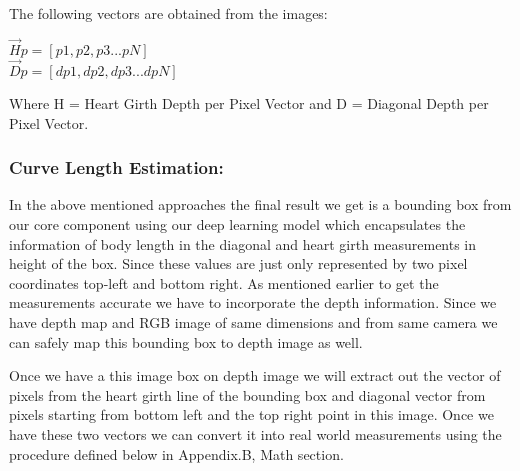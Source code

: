 The following vectors are obtained from the images:

\begin{center}
$\vec Hp = [p1, p2, p3 ... pN]$\\
$\vec Dp = [dp1, dp2, dp3 ... dpN]$

\end{center}

Where H = Heart Girth Depth per Pixel Vector and D = Diagonal Depth per Pixel Vector.



\subsubsection{Curve Length Estimation:}

In the above mentioned approaches the final result we get is a bounding box from our core component using our deep learning model which encapsulates the information of body length in the diagonal and heart girth measurements in height of the box. Since these values are just only represented by two pixel coordinates top-left and bottom right. As mentioned earlier to get the measurements accurate we have to incorporate the depth information. Since we have depth map and RGB image of same dimensions and from same camera we can safely map this bounding box to depth image as well. 

Once we have a this image box on depth image we will extract out the vector of pixels from the heart girth line of the bounding box and diagonal vector from pixels starting from bottom left and the top right  point in this image.
Once we have these two vectors we can convert it into real world measurements using the procedure defined below in Appendix.B, Math section. 

 




